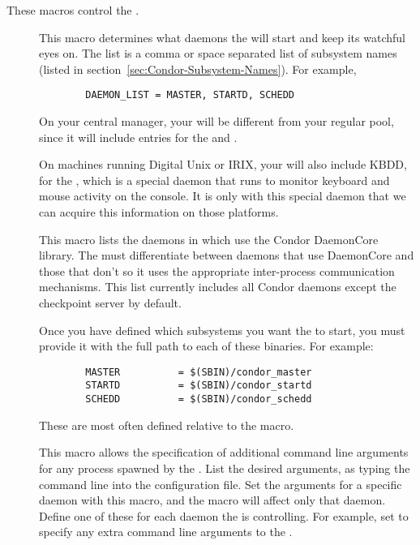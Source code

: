 These macros control the .
\begin{description}
  
\item[] \label{param:DaemonList} This macro
  determines what daemons the  will start and keep its
  watchful eyes on.  The list is a comma or space separated list of
  subsystem names (listed in
  section~\ref{sec:Condor-Subsystem-Names}).  For example,
\begin{verbatim}
        DAEMON_LIST = MASTER, STARTD, SCHEDD
\end{verbatim}

  \Note On your central manager, your 
  will be different from your regular pool, since it will include
  entries for the  and .  
  
  \Note On machines running Digital Unix or IRIX, your
   will also include KBDD, for the
  , which is a special daemon that runs to monitor
  keyboard and mouse activity on the console.  It is only with this
  special daemon that we can acquire this information on those
  platforms. 

\item[] \label{param:DCDaemonList} This macro
  lists the daemons in  which use the Condor
  DaemonCore library.  The  must differentiate between
  daemons that use DaemonCore and those that don't so it uses the
  appropriate inter-process communication mechanisms.  This list
  currently includes all Condor daemons except the checkpoint server
  by default.

\item[] \label{param:SUBSYS} Once you have defined which
  subsystems you want the  to start, you must provide
  it with the full path to each of these binaries.  For example:
\begin{verbatim}
        MASTER          = $(SBIN)/condor_master
        STARTD          = $(SBIN)/condor_startd
        SCHEDD          = $(SBIN)/condor_schedd
\end{verbatim}
  These are most often defined relative to the  macro.
  
\item[] \label{param:SubsysArgs} This macro
  allows the specification of additional command line arguments for any
  process spawned by the .
  List the desired arguments, as typing the
  command line into the configuration file.  
  Set the arguments for a specific daemon with this macro,
  and the macro will affect only that daemon. Define
  one of these for each daemon the  is controlling.
  For example, set  to specify any extra
  command line arguments to the .


\end{description}

